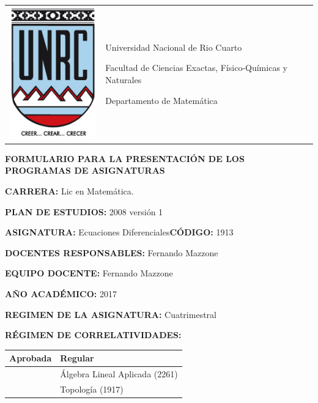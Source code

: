 \documentclass[12pt]{article}
\begin{document}
\pagestyle{plain}


\setlength{\unitlength}{1cm}
%
%

\noindent\begin{tabular}{m{} m{}}
\includegraphics[scale=.25]{escudounrc.jpg} &
{
Universidad Nacional de Rio Cuarto\par
Facultad de Ciencias Exactas, Físico-Químicas y Naturales\par
Departamento de Matemática
}
\\
\end{tabular}

\setlength{\parindent}{0pt} %

\begin{center}
 \textbf{FORMULARIO PARA LA PRESENTACIÓN DE LOS PROGRAMAS DE ASIGNATURAS}
\end{center}





 \textbf{CARRERA:}  Lic en Matemática.

 \textbf{PLAN DE ESTUDIOS:} 2008 versión 1

 \textbf{ASIGNATURA:}  Ecuaciones Diferenciales\quad\textbf{CÓDIGO:} 1913

\textbf{DOCENTES RESPONSABLES:} Fernando Mazzone

\textbf{EQUIPO DOCENTE:} Fernando Mazzone

\textbf{AÑO ACADÉMICO:} 2017

\textbf{REGIMEN DE LA ASIGNATURA:} Cuatrimestral

\textbf{RÉGIMEN DE CORRELATIVIDADES:}

\begin{table}[h]
\begin{tabular}{|l|l|}\hline
 Aprobada & Regular\\\hline
 &
 Álgebra Lineal Aplicada (2261)\\\hline
 &
Topología (1917)\\ \hline
\end{tabular}
 \end{table}
\end{document}

